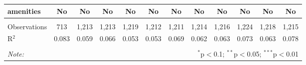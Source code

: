 \begin{table}[!htbp]
\begin{tabular}{@{\extracolsep{5pt}}lccccccccccc}
amenities & No & No & No & No & No & No & No & No & No & No & No \\ 
\hline \\[-1.8ex] 
Observations & 713 & 1,213 & 1,213 & 1,219 & 1,212 & 1,211 & 1,214 & 1,216 & 1,224 & 1,218 & 1,215 \\ 
R$^{2}$ & 0.083 & 0.059 & 0.066 & 0.053 & 0.053 & 0.069 & 0.062 & 0.063 & 0.073 & 0.063 & 0.078 \\ 
\hline 
\hline \\[-1.8ex] 
\textit{Note:}  & \multicolumn{11}{r}{$^{*}$p$<$0.1; $^{**}$p$<$0.05; $^{***}$p$<$0.01} \\ 
\end{tabular} 
\end{table} 
